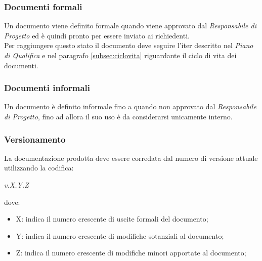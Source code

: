       \subsubsection{Documenti formali}
        Un documento viene definito formale quando viene approvato dal \emph{Responsabile di Progetto} ed è quindi pronto per essere inviato ai richiedenti.\\
        Per raggiungere questo stato il documento deve seguire l'iter descritto nel \emph{Piano di Qualifica} e nel paragrafo \ref{subsec:ciclovita} riguardante il ciclo di vita dei documenti.
      \subsubsection{Documenti informali}
        Un documento è definito informale fino a quando non approvato dal \emph{Responsabile di Progetto}, fino ad allora il suo uso è da considerarsi unicamente interno.
      \subsubsection{Versionamento}
        La documentazione prodotta deve essere corredata dal numero di versione attuale utilizzando la codifica:
        \begin{center}
          \emph{v.X.Y.Z}
        \end{center}
        dove:
        \begin{itemize}
          \item X: indica il numero crescente di uscite formali del documento;
          \item Y: indica il numero crescente di modifiche sotanziali al documento;
          \item Z: indica il numero crescente di modifiche minori apportate al documento;
        \end{itemize}
